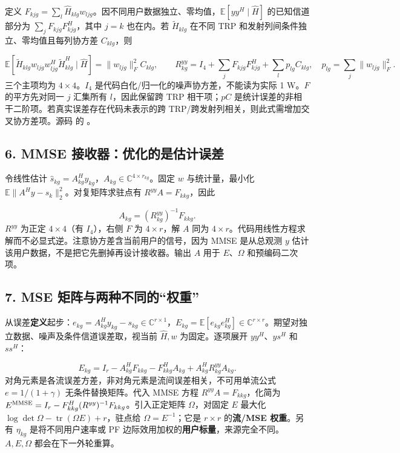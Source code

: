 \documentclass[11pt,a4paper]{ctexart}
\begin{document}
定义 $F_{kjg}=\sum_l\widehat H_{klg}w_{ljg}$。因不同用户数据独立、零均值，$\mathbb E[yy^H\mid\widehat H]$ 的已知信道部分为 $\sum_jF_{kjg}F_{kjg}^H$，其中 $j=k$ 也在内。若 $\widetilde H_{klg}$ 在不同 TRP 和发射列间条件独立、零均值且每列协方差 $C_{klg}$，则\par
\[
\mathbb E[\widetilde H_{klg}w_{ljg}w_{ljg}^H\widetilde H_{klg}^H\mid\widehat H]
=\|w_{ljg}\|_F^2C_{klg},
\qquad
R^{yy}_{kg}=I_4+\sum_jF_{kjg}F_{kjg}^H+\sum_l p_{lg}C_{klg},
\quad p_{lg}=\sum_j\|w_{ljg}\|_F^2.
\]
三个主项均为 $4\times4$。$I_4$ 是代码白化/归一化的噪声协方差，不能读为实际 1 W。$F$ 的平方先对同一 $j$ 汇集所有 $l$，因此保留跨 TRP 相干项；$pC$ 是统计误差的非相干二阶项。若真实误差存在代码未表示的跨 TRP/跨发射列相关，则此式需增加交叉协方差项。源码  的 。\par

\subsection*{6. MMSE 接收器：优化的是估计误差}

令线性估计 $\widehat s_{kg}=A_{kg}^Hy_{kg}$，$A_{kg}\in\mathbb C^{4\times r_{kg}}$。固定 $w$ 与统计量，最小化 $\mathbb E\|A^Hy-s_k\|_2^2$。对复矩阵求驻点有 $R^{yy}A=F_{kkg}$，因此\par
\[
A_{kg}=(R^{yy}_{kg})^{-1}F_{kkg}.
\]
$R^{yy}$ 为正定 $4\times4$（有 $I_4$），右侧 $F$ 为 $4\times r$，解 $A$ 同为 $4\times r$。代码用线性方程求解而不必显式逆。注意协方差含当前用户的信号，因为 MMSE 是从总观测 $y$ 估计该用户数据，不是把它先删掉再设计接收器。输出 $A$ 用于 $E$、$\Omega$ 和预编码二次项。\par

\subsection*{7. MSE 矩阵与两种不同的“权重”}

从误差\textbf{定义}起步：$e_{kg}=A_{kg}^Hy_{kg}-s_{kg}\in\mathbb C^{r\times1}$，$E_{kg}=\mathbb E[e_{kg}e_{kg}^H]\in\mathbb C^{r\times r}$。期望对独立数据、噪声及条件信道误差取，视当前 $\widehat H,w$ 为固定。逐项展开 $yy^H$、$ys^H$ 和 $ss^H$：\par
\[
E_{kg}=I_r-A_{kg}^HF_{kkg}-F_{kkg}^HA_{kg}+A_{kg}^HR^{yy}_{kg}A_{kg}.
\]
对角元素是各流误差方差，非对角元素是流间误差相关，不可用单流公式 $e=1/(1+\gamma)$ 无条件替换矩阵。代入 MMSE 方程 $R^{yy}A=F_{kkg}$，化简为 $E^{\rm MMSE}=I_r-F_{kkg}^H(R^{yy})^{-1}F_{kkg}$。引入正定矩阵 $\Omega$，对固定 $E$ 最大化 $\log\det\Omega-\operatorname{tr}(\Omega E)+r$，驻点给 $\Omega=E^{-1}$；它是 $r\times r$ 的\textbf{流/MSE 权重}。另有 $\eta_{kg}$ 是将不同用户速率或 PF 边际效用加权的\textbf{用户标量}，来源完全不同。$A,E,\Omega$ 都会在下一外轮重算。\par
\end{document}
